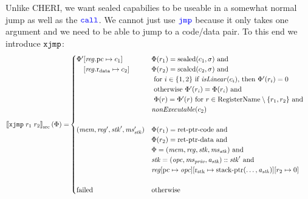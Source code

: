 \documentclass[a4paper]{article}
\newcommand{\sem}[1]{\left\llbracket #1 \right\rrbracket}
\newcommand{\ssem}[2][\Phi]{\sem{#2}_{\mathrm{src}}(#1)}
\newcommand{\sourcecolor}[1]{\color{blue}}
\newcommand{\src}[1]{{\sourcecolor{} #1}}
\newcommand{\targetcolor}[1]{\color{black}}
\newcommand{\trg}[1]{{\targetcolor{} #1}}
\newcommand{\zinstr}[1]{\texttt{#1}}
\newcommand{\oneinstr}[2]{
  \ifthenelse{\equal{#2}{}}
  {\zinstr{#1}}
  {\zinstr{#1} \; #2}
}
\newcommand{\twoinstr}[3]{
  \ifthenelse{\equal{#2#3}{}}
  {\zinstr{#1}}
  {\zinstr{#1} \; #2 \; #3}
}
\newcommand{\sjmp}[1]{\oneinstr{\src{jmp}}{#1}}
\newcommand{\scall}[2]{\twoinstr{\src{call}}{#1}{#2}}
\newcommand{\sxjmp}[2]{\twoinstr{\trg{xjmp}}{#1}{#2}}
\newcommand{\update}[2]{[#1 \mapsto #2]}
\newcommand{\shareddom}[1]{\mathrm{#1}}
\newcommand{\stkptr}[1]{\mathrm{stack\text{-}ptr}(#1)}
\newcommand{\retptrd}{\mathrm{ret\text{-}ptr\text{-}data}}
\newcommand{\retptrc}{\mathrm{ret\text{-}ptr\text{-}code}}
\newcommand{\sealed}[1]{\shareddom{sealed}(#1)}
\newcommand{\failed}{\mathrm{failed}}
\newcommand{\targetdom}[1]{\mathrm{#1}}
\newcommand{\tRegName}{\targetdom{RegisterName}}
\newcommand{\var}[1]{\mathit{#1}}
\newcommand{\reg}{\var{reg}}
\newcommand{\mem}{\var{mem}}
\newcommand{\ms}{\var{ms}}
\newcommand{\stk}{\var{stk}}
\newcommand{\priv}{\var{priv}}
\newcommand{\opc}{\var{opc}}
\newcommand{\aaddr}{\var{a}}
\newcommand{\pcreg}{\mathrm{pc}}
\newcommand{\rstk}{\mathrm{r}_\mathrm{stk}}
\newcommand{\rdata}{\mathrm{r}_\mathrm{data}}
\newcommand{\plainfun}[2]{
  \ifthenelse{\equal{#2}{}}
  {\mathit{#1}}
  {\mathit{#1}(#2)}
}
\newcommand{\nonExec}[1]{\plainfun{nonExecutable}{#1}}
\newcommand{\isLinear}[1]{\plainfun{isLinear}{#1}}
\begin{document}
Unlike CHERI, we want sealed capabilies to be useable in a somewhat normal jump as well as the $\scall{}{}$. We cannot just use $\sjmp{}$ because it only takes one argument and we need to be able to jump to a code/data pair. To this end we introduce $\sxjmp{}{}$:
\begin{align*}
  \ssem{\sxjmp{r_1}{r_2}} = & 
                              \begin{cases}
                                \Phi'
                                \arraycolsep=0pt
                                \begin{array}[t]{l}
                                  [\reg.\pcreg \mapsto c_1] \\
                                  [\reg.\rdata \mapsto c_2]
                                \end{array} & 
                                \arraycolsep=0pt
                                \begin{array}[t]{l}
                                  \Phi(r_1) = \sealed{c_1,\sigma} \text{ and } \\
                                  \Phi(r_2) = \sealed{c_2,\sigma} \text{ and } \\
                                  \text{ for $i \in \{1,2\}$ if $\isLinear{c_i}$, then $\Phi'(r_i) = 0$} \\
                                  \text{ otherwise $\Phi'(r_i) = \Phi(r_i)$ and} \\
                                  \text{ $ \Phi(r) = \Phi'(r) \text{ for } r\in \tRegName \setminus \{r_1,r_2\}$ and} \\
                                  \nonExec{c_2}
                                \end{array}\\\\
%
                                (\mem,\reg',\stk',\ms_\stk') &
                                \arraycolsep=0pt
                                \begin{array}[t]{l}
                                  \Phi(r_1) = \retptrc \text{ and } \\
                                  \Phi(r_2) = \retptrd \text{ and } \\
                                  \Phi = (\mem, \reg, \stk, \ms_\stk) \text{ and } \\
                                  \stk = (\opc,\ms_\priv,\aaddr_\stk) :: \stk' \text{ and } \\
                                  \reg \arraycolsep=0pt
                                  \begin{array}[t]{l}
                                    \update{\pcreg}{\opc}\update{\rstk}{\stkptr{\dots,\aaddr_\stk}}\update{r_2}{0}\\
                                  \end{array}
                                \end{array}\\\\
%
                                \failed & \text{otherwise}
                              \end{cases}
\end{align*}
\end{document}
